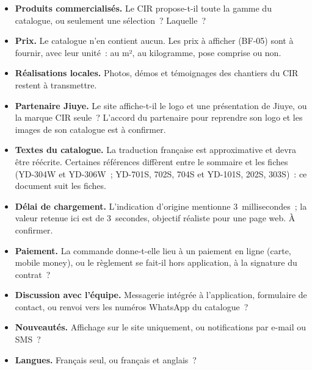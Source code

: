 \documentclass[11pt,a4paper]{article}
\begin{document}
\begin{itemize}
  \item \textbf{Produits commercialisés.} Le CIR propose-t-il toute la gamme
        du catalogue, ou seulement une sélection~? Laquelle~?
  \item \textbf{Prix.} Le catalogue n'en contient aucun. Les prix à afficher
        (BF-05) sont à fournir, avec leur unité~: au m², au kilogramme, pose
        comprise ou non.
  \item \textbf{Réalisations locales.} Photos, démos et témoignages des
        chantiers du CIR restent à transmettre.
  \item \textbf{Partenaire Jiuye.} Le site affiche-t-il le logo et une
        présentation de Jiuye, ou la marque CIR seule~? L'accord du partenaire
        pour reprendre son logo et les images de son catalogue est à
        confirmer.
  \item \textbf{Textes du catalogue.} La traduction française est
        approximative et devra être réécrite. Certaines références diffèrent
        entre le sommaire et les fiches (YD-304W et YD-306W~; YD-701S, 702S,
        704S et YD-101S, 202S, 303S)~: ce document suit les fiches.
  \item \textbf{Délai de chargement.} L'indication d'origine mentionne
        3~millisecondes~; la valeur retenue ici est de 3~secondes, objectif
        réaliste pour une page web. À confirmer.
  \item \textbf{Paiement.} La commande donne-t-elle lieu à un paiement en
        ligne (carte, mobile money), ou le règlement se fait-il hors
        application, à la signature du contrat~?
  \item \textbf{Discussion avec l'équipe.} Messagerie intégrée à
        l'application, formulaire de contact, ou renvoi vers les numéros
        WhatsApp du catalogue~?
  \item \textbf{Nouveautés.} Affichage sur le site uniquement, ou
        notifications par e-mail ou SMS~?
  \item \textbf{Langues.} Français seul, ou français et anglais~?
\end{itemize}
\end{document}
